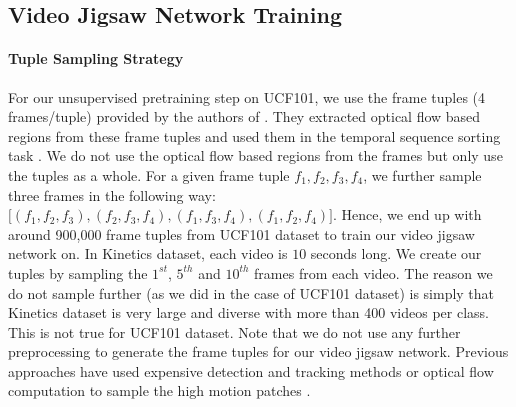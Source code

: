\documentclass[10pt,twocolumn,letterpaper]{article}
\begin{document}
\subsection{Video Jigsaw Network Training}
\paragraph{\textbf{Tuple Sampling Strategy}}
For our unsupervised pretraining step on UCF101, we use the frame tuples (4 frames/tuple) provided by the authors of \cite{lee2017unsupervised}. They extracted optical flow based regions from these frame tuples and used them in the temporal sequence sorting task \cite{lee2017unsupervised}. We do not use the optical flow based regions from the frames but only use the tuples as a whole. For a given frame tuple $f_1, f_2, f_3, f_4$, we further sample three frames in the following way: \\ $\lbrack (f_1,f_2,f_3), (f_2,f_3,f_4), (f_1,f_3,f_4), (f_1,f_2,f_4) \rbrack$. Hence, we end up with around 900,000 frame tuples from UCF101 dataset to train our video jigsaw network on. In Kinetics dataset, each video is $10$ seconds long. We create our tuples by sampling the $1^{st}$, $5^{th}$ and $10^{th}$ frames from each video. The reason we do not sample further (as we did in the case of UCF101 dataset) is simply that Kinetics dataset is very large and diverse with more than 400 videos per class. This is not true for UCF101 dataset. Note that we do not use any further preprocessing to generate the frame tuples for our video jigsaw network. Previous approaches have used expensive detection and tracking methods \cite{wang2015unsupervised} or optical flow computation to sample the high motion patches \cite{lee2017unsupervised}. 
\vspace{-3mm}
\end{document}
